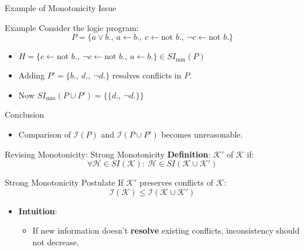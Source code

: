 \begin{frame}{Example of Monotonicity Issue}
    \begin{exampleblock}{Example}
        Consider the logic program:
        \[
            P = \{a \lor b.,\ a \leftarrow b.,\ c \leftarrow \text{not }b.,\ \neg c \leftarrow \text{not }b.\}
        \]
        \begin{itemize}
            \item \(H = \{c \leftarrow \text{not }b.,\ \neg c \leftarrow \text{not }b.,\ a \leftarrow b.\} \in SI_{\min}(P)\)
            \item Adding \(P' = \{b.,\ d.,\ \neg d.\}\) resolves conflicts in \(P\).
            \item Now \(SI_{\min}(P \cup P') = \{\{d.,\ \neg d.\}\}\)
        \end{itemize}
    \end{exampleblock}
    \begin{alertblock}{Conclusion}
        \begin{itemize}
            \item Comparison of \(\mathcal{I}(P)\) and \(\mathcal{I}(P \cup P')\) becomes unreasonable.
        \end{itemize}
    \end{alertblock}
\end{frame}

\begin{frame}{Revising Monotonicity: Strong Monotonicity}
    \textbf{Definition}: \( \mathcal{K}' \)  of \( \mathcal{K} \) if:
    \[
        \forall \mathcal{H} \in SI(\mathcal{K}):\ \mathcal{H} \in SI(\mathcal{K} \cup \mathcal{K}')
    \]
    \begin{block}{Strong Monotonicity Postulate}
        If \( \mathcal{K}' \) preserves conflicts of \( \mathcal{K} \):
        \[
            \mathcal{I}(\mathcal{K}) \leq \mathcal{I}(\mathcal{K} \cup \mathcal{K}')
        \]
    \end{block}
    \begin{itemize}
        \item \textbf{Intuition}:
              \begin{itemize}
                  \item If new information doesn't \textbf{resolve} existing conflicts, inconsistency should not decrease.
              \end{itemize}
    \end{itemize}
\end{frame}

